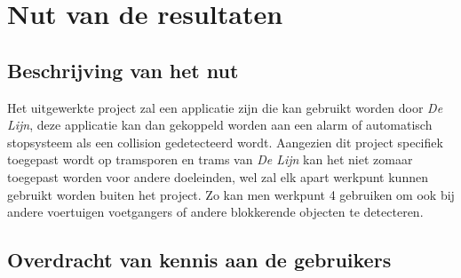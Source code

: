 \documentclass[]{book}
\begin{document}
\section{Nut van de resultaten}\label{sec:Nut}

\subsection{Beschrijving van het nut}\label{sec:BeschrijvingNut}



Het uitgewerkte project zal een applicatie zijn die kan gebruikt worden door \emph{De Lijn}, deze applicatie kan dan gekoppeld worden aan een alarm of automatisch stopsysteem als een collision gedetecteerd wordt. Aangezien dit project specifiek toegepast wordt op tramsporen en trams van \emph{De Lijn} kan het niet zomaar toegepast worden voor andere doeleinden, wel zal elk apart werkpunt kunnen gebruikt worden buiten het project.
Zo kan men werkpunt 4 gebruiken om ook bij andere voertuigen voetgangers of andere blokkerende objecten te detecteren.

\subsection{Overdracht van kennis aan de gebruikers}\label{sec:Overdracht}

\end{document}
